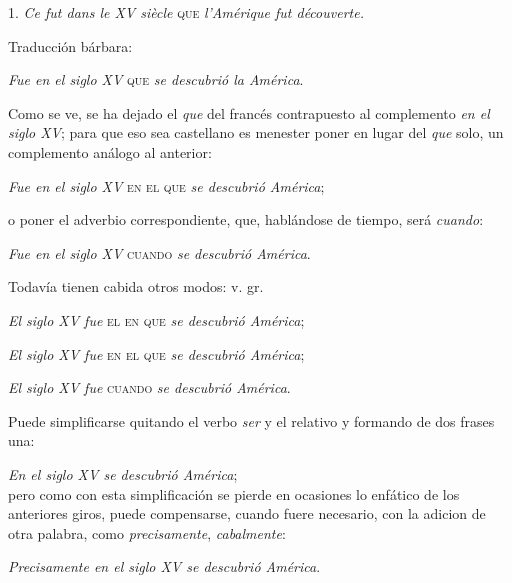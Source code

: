 \documentclass{book}
\begin{document}
1. \emph{Ce fut dans le XV siècle} \textsc{que} \emph{l'Amérique fut découverte.}

Traducci\'on bárbara:

\emph{Fue en el siglo XV} \textsc{que} \emph{se descubrió la América}.

Como se ve, se ha dejado el \emph{que} del francés contrapuesto al complemento \emph{en el siglo XV}; para que 
eso sea castellano es menester poner en lugar del \emph{que} solo, un complemento análogo al 
anterior:

\emph{Fue en el siglo XV} \textsc{en el que} \emph{se descubrió América};

o poner el adverbio correspondiente, que, hablándose de tiempo, será \emph{cuando}:

\emph{Fue en el siglo XV} \textsc{cuando} \emph{se descubrió América}.

Todavía tienen cabida otros modos: v. gr.

\emph{El siglo XV  fue} \textsc{el en que} \emph{se descubrió América};

\emph{El siglo XV  fue} \textsc{en el que} \emph{se descubrió América};

\emph{El siglo XV  fue} \textsc{cuando} \emph{se descubrió América}.

Puede simplificarse quitando el verbo \emph{ser} y el relativo y formando de dos frases una:

\emph{En el siglo XV se descubrió América};
\\
pero como con esta simplificación se pierde en ocasiones lo enfático de los anteriores giros, puede compensarse, 
cuando fuere necesario, con la adicion de otra palabra, como \emph{precisamente}, 
\emph{cabalmente}:

\emph{Precisamente en el siglo XV se descubrió América}.
\end{document}
